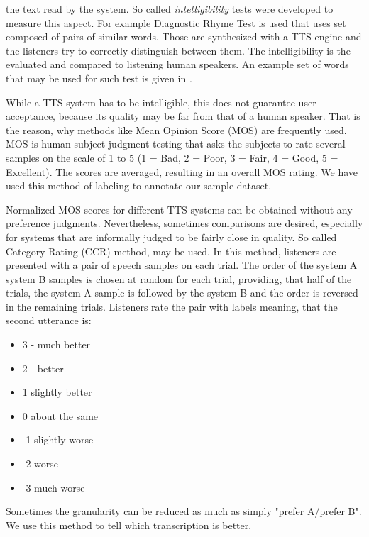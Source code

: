 the text read by the system. So called \textit{intelligibility} tests were developed to measure this aspect.
For example Diagnostic Rhyme Test is used that uses set composed of pairs of similar words.
Those are synthesized with a TTS engine and the listeners try to correctly distinguish between them.
The intelligibility is the evaluated and compared to listening human speakers.
An example set of words that may be used for such test is given in .
\par
While a TTS system has to be intelligible, this does not guarantee user acceptance, because
its quality may be far from that of a human speaker.
That is the reason, why methods like Mean Opinion Score (MOS) are frequently used.
MOS is human-subject judgment testing that asks the subjects to rate several samples on the scale of 1 to 5 (1 = Bad, 2 = Poor, 3 = Fair, 4 = Good, 5 = Excellent).
The scores are averaged, resulting in an overall MOS rating.
We have used this method of labeling to annotate our sample dataset.
\par
Normalized MOS scores for different TTS systems can be obtained without any preference judgments.
Nevertheless, sometimes comparisons are desired, especially for systems that are informally judged to be fairly close in quality.
So called Category Rating (CCR) method, may be used.
In this method, listeners are presented with a pair of speech samples on each trial. The order of the system A system B samples is chosen at random for each trial, providing, that half of the trials, the system A sample is followed by the system B and the order is reversed in the remaining trials.
Listeners rate the pair with labels meaning, that the second utterance is:
\begin{itemize}
\item 3 - much better
\item 2 - better
\item 1 slightly better
\item 0 about the same
\item -1 slightly worse
\item -2 worse
\item -3 much worse
\end{itemize}
Sometimes the granularity can be reduced as much as simply "prefer A/prefer B".
We use this method to tell which transcription is better.
